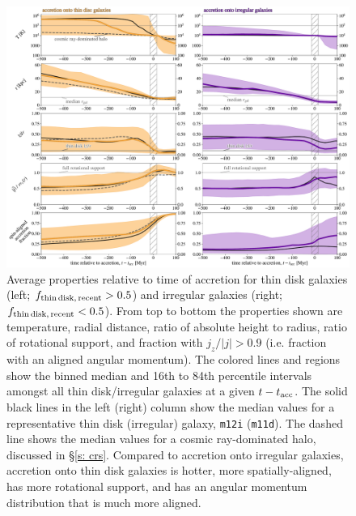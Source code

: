\documentclass[fleqn,usenatbib]{mnras}
\newcommand{\fthin}{f_{\rm thin\,disk,\,recent}}
\newcommand{\tacc}{t_{\rm acc}}
\begin{document}
\begin{figure}
    \centering
    \includegraphics[width=\textwidth]{figures/variations/relative_to_accretion/before_and_after/before_and_after_combined.pdf}
    \caption{
    Average properties relative to time of accretion for thin disk galaxies (left; $\fthin>0.5$) and irregular galaxies (right; $\fthin<0.5$).
    From top to bottom the properties shown are temperature, radial distance, ratio of absolute height to radius, ratio of rotational support, and fraction with $j_z / \vert j \vert > 0.9$ (i.e. fraction with an aligned angular momentum).
    The colored lines and regions show the binned median and 16th to 84th percentile intervals amongst all thin disk/irregular galaxies at a given $t - \tacc$.
    The solid black lines in the left (right) column show the median values for a representative thin disk (irregular) galaxy, \texttt{m12i} (\texttt{m11d}).
    The dashed line shows the median values for a cosmic ray-dominated halo, discussed in \S\ref{s: crs}.
    Compared to accretion onto irregular galaxies, accretion onto thin disk galaxies is hotter, more spatially-aligned, has more rotational support, and has an angular momentum distribution that is much more aligned.
    }
    \label{f: before and after combined}
\end{figure}
\end{document}
